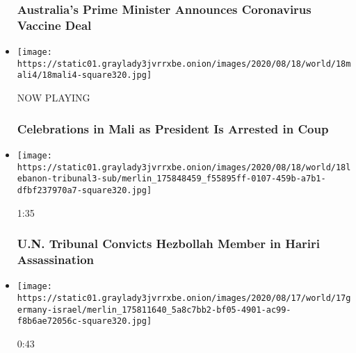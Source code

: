 \begin{itemize}
  \hypertarget{australias-prime-minister-announces-coronavirus-vaccine-deal}{%
  \subsubsection{Australia's Prime Minister Announces Coronavirus
  Vaccine
  Deal}\label{australias-prime-minister-announces-coronavirus-vaccine-deal}}
\item
  \texttt{[image: https://static01.graylady3jvrrxbe.onion/images/2020/08/18/world/18mali4/18mali4-square320.jpg]}

  NOW PLAYING

  \hypertarget{celebrations-in-mali-as-president-is-arrested-in-coup-1}{%
  \subsubsection{Celebrations in Mali as President Is Arrested in
  Coup}\label{celebrations-in-mali-as-president-is-arrested-in-coup-1}}
\item
  \href{https://www.nytimes3xbfgragh.onion/video/us/politics/100000007294649/hezbollah-member-guilty-hariri-assassination.html?action=click\&module=video-series-bar\&region=header\&pgtype=Article\&playlistId=video/world}{}

  \texttt{[image: https://static01.graylady3jvrrxbe.onion/images/2020/08/18/world/18lebanon-tribunal3-sub/merlin\_175848459\_f55895ff-0107-459b-a7b1-dfbf237970a7-square320.jpg]}

  1:35

  \hypertarget{un-tribunal-convicts-hezbollah-member-in-hariri-assassination}{%
  \subsubsection{U.N. Tribunal Convicts Hezbollah Member in Hariri
  Assassination}\label{un-tribunal-convicts-hezbollah-member-in-hariri-assassination}}
\item
  \href{https://www.nytimes3xbfgragh.onion/video/us/politics/100000007294367/israeli-fighter-jets-1st-joint-military-exercise-in-germany.html?action=click\&module=video-series-bar\&region=header\&pgtype=Article\&playlistId=video/world}{}

  \texttt{[image: https://static01.graylady3jvrrxbe.onion/images/2020/08/17/world/17germany-israel/merlin\_175811640\_5a8c7bb2-bf05-4901-ac99-f8b6ae72056c-square320.jpg]}

  0:43

  \hypertarget{israeli-fighter-jets-first-joint-military-exercise-in-germany}{%
}
\end{itemize}
